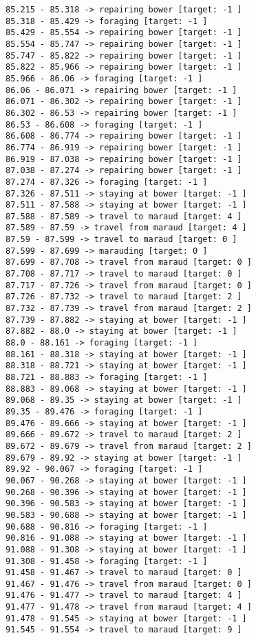 \documentclass[11pt]{article}
\begin{document}
\begin{Verbatim}[commandchars=\\\{\}]
85.215 - 85.318 -> repairing bower [target: -1 ]
85.318 - 85.429 -> foraging [target: -1 ]
85.429 - 85.554 -> repairing bower [target: -1 ]
85.554 - 85.747 -> repairing bower [target: -1 ]
85.747 - 85.822 -> repairing bower [target: -1 ]
85.822 - 85.966 -> repairing bower [target: -1 ]
85.966 - 86.06 -> foraging [target: -1 ]
86.06 - 86.071 -> repairing bower [target: -1 ]
86.071 - 86.302 -> repairing bower [target: -1 ]
86.302 - 86.53 -> repairing bower [target: -1 ]
86.53 - 86.608 -> foraging [target: -1 ]
86.608 - 86.774 -> repairing bower [target: -1 ]
86.774 - 86.919 -> repairing bower [target: -1 ]
86.919 - 87.038 -> repairing bower [target: -1 ]
87.038 - 87.274 -> repairing bower [target: -1 ]
87.274 - 87.326 -> foraging [target: -1 ]
87.326 - 87.511 -> staying at bower [target: -1 ]
87.511 - 87.588 -> staying at bower [target: -1 ]
87.588 - 87.589 -> travel to maraud [target: 4 ]
87.589 - 87.59 -> travel from maraud [target: 4 ]
87.59 - 87.599 -> travel to maraud [target: 0 ]
87.599 - 87.699 -> marauding [target: 0 ]
87.699 - 87.708 -> travel from maraud [target: 0 ]
87.708 - 87.717 -> travel to maraud [target: 0 ]
87.717 - 87.726 -> travel from maraud [target: 0 ]
87.726 - 87.732 -> travel to maraud [target: 2 ]
87.732 - 87.739 -> travel from maraud [target: 2 ]
87.739 - 87.882 -> staying at bower [target: -1 ]
87.882 - 88.0 -> staying at bower [target: -1 ]
88.0 - 88.161 -> foraging [target: -1 ]
88.161 - 88.318 -> staying at bower [target: -1 ]
88.318 - 88.721 -> staying at bower [target: -1 ]
88.721 - 88.883 -> foraging [target: -1 ]
88.883 - 89.068 -> staying at bower [target: -1 ]
89.068 - 89.35 -> staying at bower [target: -1 ]
89.35 - 89.476 -> foraging [target: -1 ]
89.476 - 89.666 -> staying at bower [target: -1 ]
89.666 - 89.672 -> travel to maraud [target: 2 ]
89.672 - 89.679 -> travel from maraud [target: 2 ]
89.679 - 89.92 -> staying at bower [target: -1 ]
89.92 - 90.067 -> foraging [target: -1 ]
90.067 - 90.268 -> staying at bower [target: -1 ]
90.268 - 90.396 -> staying at bower [target: -1 ]
90.396 - 90.583 -> staying at bower [target: -1 ]
90.583 - 90.688 -> staying at bower [target: -1 ]
90.688 - 90.816 -> foraging [target: -1 ]
90.816 - 91.088 -> staying at bower [target: -1 ]
91.088 - 91.308 -> staying at bower [target: -1 ]
91.308 - 91.458 -> foraging [target: -1 ]
91.458 - 91.467 -> travel to maraud [target: 0 ]
91.467 - 91.476 -> travel from maraud [target: 0 ]
91.476 - 91.477 -> travel to maraud [target: 4 ]
91.477 - 91.478 -> travel from maraud [target: 4 ]
91.478 - 91.545 -> staying at bower [target: -1 ]
91.545 - 91.554 -> travel to maraud [target: 9 ]

\end{Verbatim}
\end{document}
